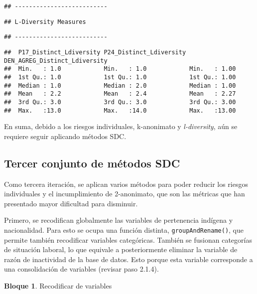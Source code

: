 \documentclass[
]{book}
\theoremstyle{definition}
\theoremstyle{definition}
\newtheorem{example}{Bloque}[chapter]
\theoremstyle{definition}
\theoremstyle{definition}
\theoremstyle{remark}
\begin{document}
\begin{verbatim}
## --------------------------
\end{verbatim}

\begin{verbatim}
## L-Diversity Measures
\end{verbatim}

\begin{verbatim}
## --------------------------
\end{verbatim}

\begin{verbatim}
##  P17_Distinct_Ldiversity P24_Distinct_Ldiversity DEN_AGREG_Distinct_Ldiversity
##  Min.   : 1.0            Min.   : 1.0            Min.   : 1.00                
##  1st Qu.: 1.0            1st Qu.: 1.0            1st Qu.: 1.00                
##  Median : 1.0            Median : 2.0            Median : 1.00                
##  Mean   : 2.2            Mean   : 2.4            Mean   : 2.27                
##  3rd Qu.: 3.0            3rd Qu.: 3.0            3rd Qu.: 3.00                
##  Max.   :13.0            Max.   :14.0            Max.   :13.00
\end{verbatim}

En suma, debido a los riesgos individuales, k-anonimato y \emph{l-diversity}, aún se requiere seguir aplicando métodos SDC.

\hypertarget{tercer-conjunto-de-muxe9todos-sdc}{%
\subsection{Tercer conjunto de métodos SDC}\label{tercer-conjunto-de-muxe9todos-sdc}}

Como tercera iteración, se aplican varios métodos para poder reducir los riesgos individuales y el incumplimiento de 2-anonimato, que son las métricas que han presentado mayor dificultad para disminuir.

Primero, se recodifican globalmente las variables de pertenencia indígena y nacionalidad. Para esto se ocupa una función distinta, \texttt{groupAndRename()}, que permite también recodificar variables categóricas. También se fusionan categorías de situación laboral, lo que equivale a posteriormente eliminar la variable de razón de inactividad de la base de datos. Esto porque esta variable corresponde a una consolidación de variables (revisar paso 2.1.4).

\begin{example}
\protect\hypertarget{exm:bloque64nbm}{}\label{exm:bloque64nbm}Recodificar de variables
\end{example}
\end{document}
